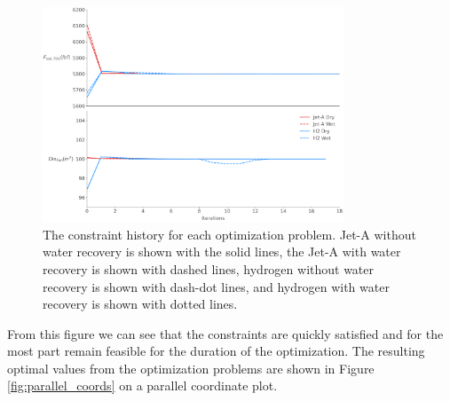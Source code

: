 \documentclass[conf]{new-aiaa}
\begin{document}
\begin{figure}[hbt!]
    \centering
    \includegraphics[width=0.8\textwidth]{cons.pdf}
    \caption{The constraint history for each optimization problem.
        Jet-A without water recovery is shown with the solid lines, the Jet-A with water recovery is shown with dashed lines, hydrogen without water recovery is shown with dash-dot lines, and hydrogen with water recovery is shown with dotted lines.}
    \label{fig:history_cons}
\end{figure}

From this figure we can see that the constraints are quickly satisfied and for the most part remain feasible for the duration of the optimization.
The resulting optimal values from the optimization problems are shown in Figure \ref{fig:parallel_coords} on a parallel coordinate plot.
\end{document}
